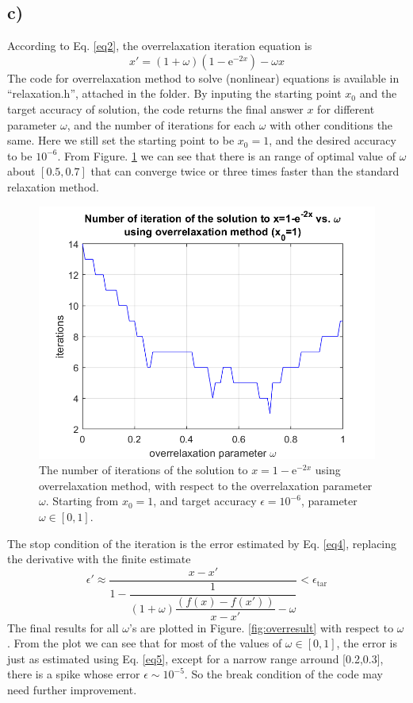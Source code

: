 \documentclass[12pt, graphicx]{article}
\begin{document}
\subsection*{c)}
According to Eq. \ref{eq2}, the overrelaxation iteration equation is 
\begin{equation}
x'=(1+\omega)(1-\mathrm{e}^{-2x})-\omega x
\end{equation}
The code for overrelaxation method to solve (nonlinear) equations is available in \textquotedblleft relaxation.h\textquotedblright, attached in the folder. By inputing the starting point $x_0$ and the target accuracy of solution, the code returns the final answer $x$ for different parameter $\omega$, and the number of iterations for each $\omega$ with other conditions the same. Here we still set the starting point to be $x_0=1$, and the desired accuracy to be $10^{-6}$. From Figure. \ref{fig:overrel} we can see that there is an range of optimal value of $\omega$ about $[0.5,0.7]$ that can converge twice or three times faster than the standard relaxation method. 

\begin{figure}[ht]
\centering
\includegraphics[width = 120mm]{overrelaxation.png}
\caption{The number of iterations of the solution to $x=1-\mathrm{e}^{-2x}$ using overrelaxation method, with respect to the overrelaxation parameter $\omega$. Starting from $x_0=1$, and target accuracy $\epsilon=10^{-6}$, parameter $\omega\in[0,1]$.}
\label{fig:overrel}
\end{figure}

The stop condition of the iteration is the error estimated by Eq. \ref{eq4}, replacing the derivative with the finite estimate 
\begin{equation}
\epsilon'\approx\dfrac{x-x'}{1-\dfrac{1}{(1+\omega)\dfrac{(f(x)-f(x'))}{x-x'}-\omega}}<\epsilon_\mathrm{tar}
\label{eq5}
\end{equation}
The final results for all $\omega$'s are plotted in Figure. \ref{fig:overresult} with respect to $\omega$. From the plot we can see that for most of the values of $\omega\in[0,1]$, the error is just as estimated using Eq. \ref{eq5}, except for a narrow range arround [0.2,0.3], there is a spike whose error $\epsilon\sim10^{-5}$. So the break condition of the code may need further improvement.
\end{document}
